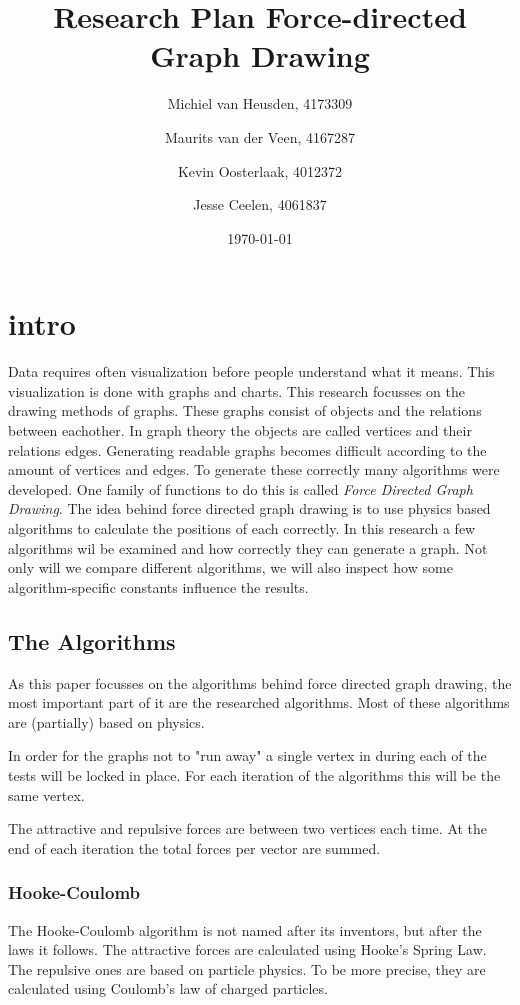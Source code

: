 \documentclass[a4paper,12pt]{article}
\title{Research Plan Force-directed Graph Drawing}
\author{
  Michiel van Heusden, 4173309 \and
  Maurits van der Veen, 4167287 \and
  Kevin Oosterlaak, 4012372 \and
  Jesse Ceelen, 4061837
  }
\date{\today}
\begin{document}
  \maketitle
  \tableofcontents
  \section{intro}
  Data requires often visualization before people understand what it means.
  This visualization is done with graphs and charts.
  This research focusses on the drawing methods of graphs.
  These graphs consist of objects and the relations between eachother.
  In graph theory the objects are called vertices and their relations edges.\cite{bondy1976graph}
  Generating readable graphs becomes difficult according to the amount of vertices and edges.
  To generate these correctly many algorithms were developed.
  One family of functions to do this is called \emph{Force Directed Graph Drawing}.
  The idea behind force directed graph drawing is to use physics based algorithms to calculate the positions of each correctly.
  In this research a few algorithms wil be examined and how correctly they can generate a graph.
  Not only will we compare different algorithms, we will also inspect how some algorithm-specific constants influence the results.

  \subsection{The Algorithms}\label{par:algorithms}
    As this paper focusses on the algorithms behind force directed graph drawing, the most important part of it are the researched algorithms.
    Most of these algorithms are (partially) based on physics.

    In order for the graphs not to "run away" a single vertex in during each of the tests will be locked in place.
    For each iteration of the algorithms this will be the same vertex.

    The attractive and repulsive forces are between two vertices each time.
    At the end of each iteration the total forces per vector are summed.

    \subsubsection{Hooke-Coulomb}
    The Hooke-Coulomb algorithm is not named after its inventors, but after the laws it follows.
    The attractive forces are calculated using Hooke's Spring Law.
    The repulsive ones are based on particle physics.
    To be more precise, they are calculated using Coulomb's law of charged particles.
\end{document}
